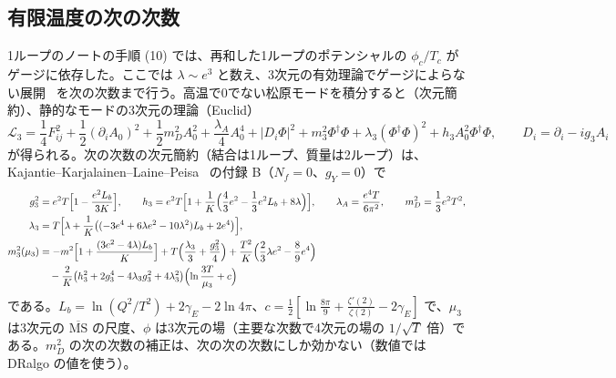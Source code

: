 \documentclass[a4paper,10pt]{ltjsarticle}
\newcommand{\MSbar}{\overline{\mathrm{MS}}}
\begin{document}
\subsection{有限温度の次の次数}\label{sec:thnlo}

1ループのノートの手順 (10) では、再和した1ループのポテンシャルの $\phi_c/T_c$ がゲージに依存した。ここでは $\lambda\sim e^3$ と数え、3次元の有効理論でゲージによらない展開~\cite{el20,hlrst22} を次の次数まで行う。高温で0でない松原モードを積分すると（次元簡約）、静的なモードの3次元の理論（Euclid）
\begin{equation}
\mathcal L_3=\frac14F_{ij}^2+\frac12(\partial_iA_0)^2+\frac12m_D^2A_0^2+\frac{\lambda_A}4A_0^4+|D_i\Phi|^2+m_3^2\Phi^\dagger\Phi+\lambda_3(\Phi^\dagger\Phi)^2+h_3A_0^2\Phi^\dagger\Phi,\qquad D_i=\partial_i-ig_3A_i
\label{eq:L3}
\end{equation}
が得られる。次の次数の次元簡約（結合は1ループ、質量は2ループ）は、Kajantie--Karjalainen--Laine--Peisa~\cite{kklp98} の付録 B（$N_f=0$、$g_Y=0$）で
\begin{equation}
\begin{aligned}
g_3^2&=e^2T\Bigl[1-\frac{e^2L_b}{3K}\Bigr],\qquad h_3=e^2T\Bigl[1+\frac1K\Bigl(\frac43e^2-\frac13e^2L_b+8\lambda\Bigr)\Bigr],\qquad \lambda_A=\frac{e^4T}{6\pi^2},\qquad m_D^2=\frac13e^2T^2,\\
\lambda_3&=T\Bigl[\lambda+\frac1K\bigl((-3e^4+6\lambda e^2-10\lambda^2)L_b+2e^4\bigr)\Bigr],\\
m_3^2(\mu_3)&=-m^2\Bigl[1+\frac{(3e^2-4\lambda)L_b}K\Bigr]+T\Bigl(\frac{\lambda_3}3+\frac{g_3^2}4\Bigr)+\frac{T^2}K\Bigl(\frac23\lambda e^2-\frac89e^4\Bigr)\\
&\quad-\frac2K\bigl(h_3^2+2g_3^4-4\lambda_3g_3^2+4\lambda_3^2\bigr)\Bigl(\ln\frac{3T}{\mu_3}+c\Bigr)
\end{aligned}
\label{eq:dr}
\end{equation}
である。$L_b=\ln(Q^2/T^2)+2\gamma_E-2\ln4\pi$、$c=\frac12[\ln\frac{8\pi}9+\frac{\zeta'(2)}{\zeta(2)}-2\gamma_E]$ で、$\mu_3$ は3次元の $\MSbar$ の尺度、$\phi$ は3次元の場（主要な次数で4次元の場の $1/\sqrt T$ 倍）である。$m_D^2$ の次の次数の補正は、次の次の次数にしか効かない（数値では DRalgo の値を使う）。
\end{document}
